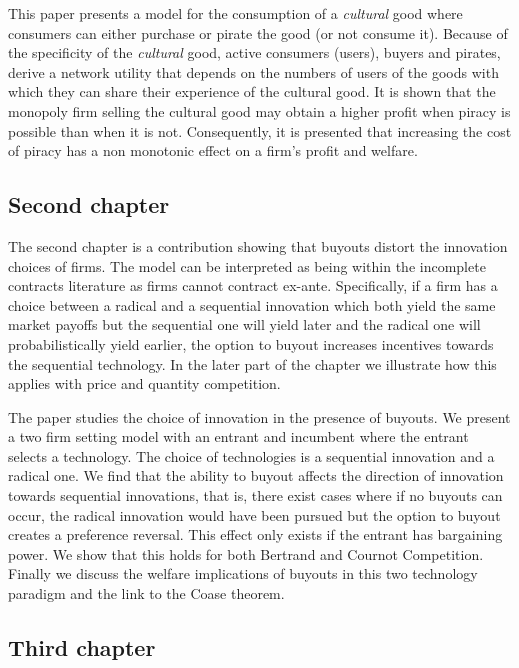 This paper presents a model for the consumption of a \textit{cultural} good where consumers can either purchase or pirate the good (or not consume it). Because of the specificity of the \textit{cultural} good, active consumers (users), buyers and pirates, derive a network utility that depends on the numbers of users of the goods with which they can share their experience of the cultural good. It is shown that the monopoly firm selling the cultural good may obtain a higher profit when piracy is possible than when it is not. Consequently, it is presented that increasing the cost of piracy has a non monotonic effect on a firm's profit and welfare.

\subsection{Second chapter}

The second chapter is a contribution showing that buyouts distort the innovation choices of firms. The model can be interpreted as being within the incomplete contracts literature as firms cannot contract ex-ante. Specifically, if a firm has a choice between a radical and a sequential innovation which both yield the same market payoffs but the sequential one will yield later and the radical one will probabilistically yield earlier, the option to buyout increases incentives towards the sequential technology. In the later part of the chapter we illustrate how this applies with price and quantity competition.

The paper studies the choice of innovation in the presence of buyouts. We present a two firm setting model with an entrant and incumbent where the entrant selects a technology. The choice of technologies is a sequential innovation and a radical one. We find that the ability to buyout affects the direction of innovation towards sequential innovations, that is, there exist cases where if no buyouts can occur, the radical innovation would have been pursued but the option to buyout creates a preference reversal. This effect only exists if the entrant has bargaining power. We show that this holds for both Bertrand and Cournot Competition. Finally we discuss the welfare implications of buyouts in this two technology paradigm and the link to the Coase theorem. 

 \subsection{Third chapter}

